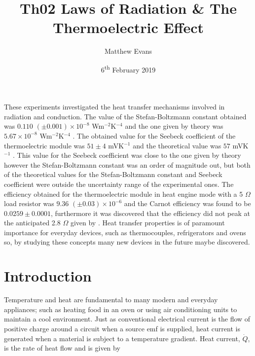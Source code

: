 \documentclass{article}
\begin{document}
\title{Th02 Laws of Radiation \& The Thermoelectric Effect} %
\author{Matthew Evans}%
\date{6\textsuperscript{th} February 2019} %
\maketitle %

\begin{onecolabstract}
\noindent
These experiments investigated the heat transfer mechanisms involved in radiation and conduction. The value of the Stefan-Boltzmann constant obtained was $0.110$ $(\pm0.001) \times 10^{-8}$ Wm$^{-2}$K$^{-4}$ and the one given by theory was $5.67 \times 10^{-8}$ Wm$^{-2}$K$^{-4}$ \cite{Book01}. The obtained value for the Seebeck coefficient of the thermoelectric module was $51 \pm 4$ mVK$^{-1}$ and the theoretical value was $57$ mVK$^{-1}$ \cite{Paper02}. This value for the Seebeck coefficient was close to the one given by theory however the Stefan-Boltzmann constant was an order of magnitude out, but both of the theoretical values for the Stefan-Boltzmann constant and Seebeck coefficient were outside the uncertainty range of the experimental ones. The efficiency obtained for the thermoelectric module in heat engine mode with a 5 $\Omega$ load resistor was $9.36$ $(\pm0.03) \times 10^{-6}$ and the Carnot efficiency was found to be $0.0259 \pm 0.0001$, furthermore it was discovered that the efficiency did not peak at the anticipated 2.8 $\Omega$ given by \cite{Paper02}. Heat transfer properties is of paramount importance for everyday devices, such as thermocouples, refrigerators and ovens so, by studying these concepts many new devices in the future maybe discovered.

\end{onecolabstract}
\vspace{5mm} %

\section{Introduction}
\label{sec:introduction}

Temperature and heat are fundamental to many modern and everyday appliances; such as heating food in an oven or using air conditioning units to maintain a cool environment. 
Just as conventional electrical current is the flow of positive charge around a circuit when a source emf is supplied, heat current is generated when a material is subject to a temperature gradient. Heat current, $\dot{Q}$, is the rate of heat flow and is given by
\end{document}
